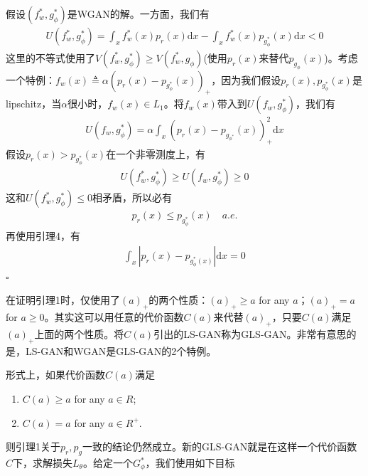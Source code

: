             \begin{Proof}
            假设$(f_w^*,g_\phi^*)$是WGAN的解。一方面，我们有
            \begin{align*}
            U(f_w^*,g_\phi^*) = \int_x f_w^*(x)p_r(x)\mathrm{d}x - \int_xf_w^*(x)p_{g_\phi^*}(x)\mathrm{d}x <0
            \end{align*}
            这里的不等式使用了$V(f_w^*,g_\phi^*) \geqslant V(f_w^*,g_\phi)$(使用$p_r(x)$来替代$p_{g_\phi}(x)$)。考虑一个特例：$f_w(x) \triangleq \alpha(p_r(x)-p_{g_\phi^*}(x))_+$，因为我们假设$p_r(x),p_{g_\phi^*}(x)$是lipschitz，当$\alpha$很小时，$f_w(x)\in L_1$。将$f_w(x)$带入到$U(f_w,g_\phi^*)$，我们有
            \begin{align*}
            U(f_w,g_\phi^*) = \alpha\int_x (p_r(x) - p_{g_{\phi^*}}(x))_+^2\mathrm{d}x
            \end{align*}
            假设$p_r(x) >p_{g_\phi^*}(x)$在一个非零测度上，有
            \begin{align*}
            U(f_w^*,g_\phi^*) \geqslant U(f_w,g_\phi^*) \geqslant 0
            \end{align*}
            这和$U(f_w^*,g_\phi^*) \leqslant 0$相矛盾，所以必有
            \begin{align*}
            p_r(x) \leqslant p_{g_\phi^*}(x) \quad a.e.
            \end{align*}
            再使用引理4，有
            \begin{align*}
            \int_x |p_r(x) -p_{g_\phi^*(x)}|\mathrm{d}x = 0
            \end{align*}
            $\square$
            \end{Proof}
            \par
            在证明引理1时，仅使用了$(a)_+$的两个性质：$(a)_+ \geqslant a$ for any $a$；$(a)_+ = a$ for $a \geqslant 0$。其实这可以用任意的代价函数$C(a)$来代替$(a)_+$，只要$C(a)$满足$(a)_+$上面的两个性质。将$C(a)$引出的LS-GAN称为GLS-GAN。非常有意思的是，LS-GAN和WGAN是GLS-GAN的2个特例。
            \par
            形式上，如果代价函数$C(a)$满足
            \begin{enumerate}
            \item $C(a) \geqslant a$ for any $a\in R$;
            \item $C(a) = a$ for any $a\in R^+$.
            \end{enumerate}
            则引理1关于$p_r,p_g$一致的结论仍然成立。新的GLS-GAN就是在这样一个代价函数$C$下，求解损失$L_\theta$。给定一个$G_\phi^*$，我们使用如下目标
